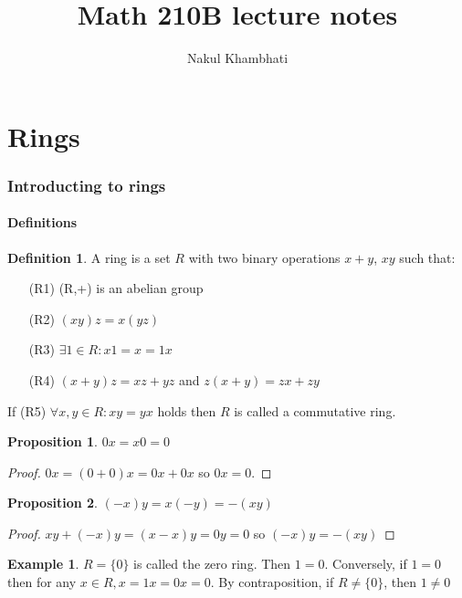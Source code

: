 \documentclass{article}
\title{Math 210B lecture notes}
\author{Nakul Khambhati}
\theoremstyle{definition}
\newtheorem{definition}{Definition}[subsection]
\newtheorem{eg}{Example}[subsection]
\theoremstyle{remark}
\theoremstyle{plain}
\newtheorem{prop}{Proposition}[subsection]
\begin{document}
\maketitle
\tableofcontents

\newpage

\part{Rings}

\section{Introducting to rings}
\subsection{Definitions}

\begin{definition}
    A ring is a set $R$ with two binary operations $x+y$, $xy$ such that:
    \begin{enumerate}
        \item[(R1)] (R,+) is an abelian group
        \item[(R2)] $(xy)z = x(yz)$
        \item[(R3)] $\exists 1 \in R: x1 = x = 1x$ 
        \item[(R4)] $(x+y)z = xz + yz$ and $z(x+y) = zx + zy$
    \end{enumerate}
\end{definition}

If (R5) $\forall x,y \in R: xy = yx$ holds then $R$ is called a commutative ring. 

\begin{prop}
$0x = x0 = 0$
\end{prop}
\begin{proof}
    $0x = (0+0)x = 0x + 0x$ so $0x = 0$.
\end{proof}

\begin{prop}
    $(-x)y = x(-y) = -(xy)$
\end{prop}
\begin{proof}
    $ xy + (-x)y = (x-x)y = 0y = 0$ so $(-x)y = -(xy)$
\end{proof}

\begin{eg}
$R = \{0\}$ is called the zero ring. Then $1 = 0$. Conversely, if $1=0$ then for any $x \in R, x = 1x = 0x = 0$. By contraposition, if $R \neq \{0\}$, then $1\neq0$
\end{eg}
\end{document}
